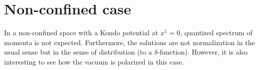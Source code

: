 \section{Non-confined case}\label{vacuum-without_bdy}
In a non-confined space with a Kondo potential at $x^1 = 0$,
quantized spectrum of momenta is not expected.
Furthermore, the solutions are not normalization in the usual sense but in the sense of distribution (to a $\delta$-function). 
However, it is also interesting to see how the vacuum is polarized in this case. 


